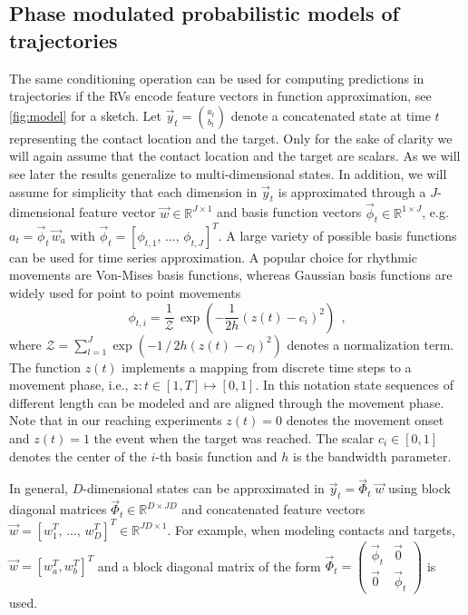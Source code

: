 \subsection{Phase modulated probabilistic models of trajectories}
The same conditioning operation can be used for computing predictions in trajectories if the RVs 
encode feature vectors in function approximation, see \FigureAbbr \ref{fig:model} for a sketch. 
Let $\vec y_t = {a_t \choose b_t}$ denote a concatenated state at time $t$ representing the contact location and the target. 
Only for the sake of clarity we will again assume that the contact location and the target are 
scalars. As we will see later the results generalize to multi-dimensional states. 
In addition, we will assume for simplicity that each dimension in $\vec y_t$ is 
approximated through a $J$-dimensional feature vector $\vec w \in \mathbb{R}^{J \times 1}$ 
and basis function vectors $\vec \phi_t \in \mathbb{R}^{1 \times J}$, 
e.g.  $a_t = \vec \phi_t \, \vec w_a$ with $\vec \phi_t = \left[\phi_{t,1},\, ..., \, \phi_{t,J}\right]^T$. 
A large variety of possible basis functions can be used for time series approximation. A popular choice 
for rhythmic movements are Von-Mises basis functions, 
whereas Gaussian basis functions are widely used for point to point movements \cite{Rueckert2013, ijspeert2013dynamical} 
\begin{equation*}
 \phi_{t,i} = \frac{1}{\mathcal{Z}} \, \exp \left( -\frac{1}{2 h} \left(z(t) - c_i \right)^2 \right) ~~,
\end{equation*}
where $\mathcal{Z} = \sum_{l=1}^J \exp \left( -1\,/\,2 h \left(z(t) - c_l \right)^2 \right)$ denotes a normalization term.  
The function $z(t)$ implements a mapping from discrete time steps to a movement phase, i.e., $z: t \in [1,T] \mapsto [0,1]$. 
In this notation state sequences of different length can be modeled and are aligned through the movement phase. 
Note that in our reaching experiments $z(t)=0$ denotes the movement onset and $z(t)=1$ the event when the target was reached. 
The scalar $c_i \in [0,1]$ denotes the center of the $i$-th basis function and $h$ is the bandwidth 
parameter. 

In general, $D$-dimensional states can be approximated in $\vec y_t = \vec
\Phi_t \; \vec w$ using block diagonal matrices $\vec \Phi_t \in \mathbb{R}^{D
\times J D}$ and concatenated feature vectors $\vec w = \left[w_1^T,\, ...,\,
w_D^T\right]^T \in \mathbb{R}^{J D \times 1}$. For example, when modeling
contacts and targets,  $\vec w = \left[w_a^T, w_b^T\right]^T$ and a block
diagonal matrix of the form $\vec \Phi_t = \left( \begin{smallmatrix} \vec
\phi_t & \vec 0 \\ \vec 0 & \vec \phi_t \end{smallmatrix} \right)$ is used. 

